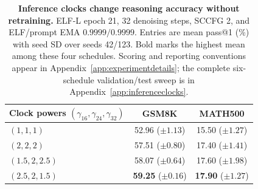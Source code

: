 \begin{table}[htbp]
\centering\small
\setlength{\tabcolsep}{10pt}
\begin{tabular}{lcc}
\toprule
Clock powers $(\gamma_{16},\gamma_{24},\gamma_{32})$ & GSM8K & MATH500 \\
\midrule
$(1,1,1)$ & 52.96 {\scriptsize($\pm 1.13$)} & 15.50 {\scriptsize($\pm 1.27$)} \\
$(2,2,2)$ & 57.51 {\scriptsize($\pm 0.80$)} & 17.40 {\scriptsize($\pm 1.41$)} \\
$(1.5,2,2.5)$ & 58.07 {\scriptsize($\pm 0.64$)} & 17.60 {\scriptsize($\pm 1.98$)} \\
$(2.5,2,1.5)$ & \textbf{59.25} {\scriptsize($\pm 0.16$)} & \textbf{17.90} {\scriptsize($\pm 1.27$)} \\
\bottomrule
\end{tabular}
\caption{\textbf{Inference clocks change reasoning accuracy without retraining.} ELF-L epoch 21, 32 denoising steps, SCCFG 2, and ELF/prompt EMA $0.9999/0.9999$. Entries are mean pass@1 (\%) with seed SD over seeds 42/123. Bold marks the highest mean among these four schedules. Scoring and reporting conventions appear in Appendix~\ref{app:experimentdetails}; the complete six-schedule validation/test sweep is in Appendix~\ref{app:inferenceclocks}.}
\label{tab:inferenceclocks}
\end{table}
